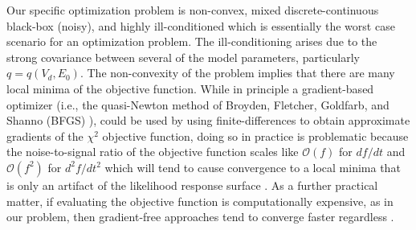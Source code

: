 \documentclass[12pt,a4paper,oneside]{book}
\begin{document}
Our specific optimization problem is non-convex, mixed discrete-continuous black-box (noisy), and highly ill-conditioned which is essentially the worst case scenario for an optimization problem. The ill-conditioning arises due to the strong covariance between several of the model parameters, particularly $q=q(V_d, E_0)$. The non-convexity of the problem implies that there are many local minima of the objective function. While in principle a gradient-based optimizer (i.e., the quasi-Newton method of Broyden, Fletcher, Goldfarb, and Shanno (BFGS) \cite{nocedal_numerical_2006}), could be used by using finite-differences to obtain approximate gradients of the $\chi^2$ objective function, doing so in practice is problematic because the noise-to-signal ratio of the objective function scales like $\mathcal{O}(f)$ for $df/dt$ and $\mathcal{O}(f^2)$ for $d^2f/dt^2$ which will tend to cause convergence to a local minima that is only an artifact of the likelihood response surface \cite{wood_data_1982}. As a further practical matter, if evaluating the objective function is computationally expensive, as in our problem, then gradient-free approaches tend to converge faster regardless \cite{kolda_optimization_2003}.
 
\end{document}

